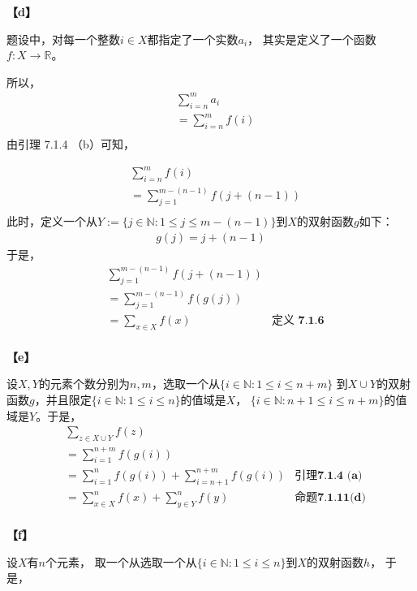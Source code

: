 \documentclass{article}
\theoremstyle{mystyle}
\begin{document}
\textbf{【d】}

题设中，对每一个整数$i \in X$都指定了一个实数$a_i$，
其实是定义了一个函数$f:X \rightarrow \mathbb{R}$。

所以，
\begin{align*}
     & \sum\limits_{i=n}^m a_i   \\
     & =\sum\limits_{i=n}^m f(i) \\
\end{align*}
由引理 7.1.4 （b）可知，

\begin{align*}
     & \sum\limits_{i=n}^m f(i)                 \\
     & = \sum\limits_{j=1}^{m-(n-1)} f(j+(n-1)) \\
\end{align*}
此时，定义一个从$Y := \{j \in \mathbb{N}: 1 \leq j \leq m-(n-1)\}$到$X$的双射函数$g$如下：
\begin{align*}
    g(j) = j+(n-1)
\end{align*}
于是，
\begin{align*}
     & \sum\limits_{j=1}^{m-(n-1)} f(j+(n-1))                     \\
     & =\sum\limits_{j=1}^{m-(n-1)} f(g(j))                       \\
     & =\sum\limits_{x \in X} f(x)            & \textbf{定义 7.1.6} \\
\end{align*}

\textbf{【e】}

设$X,Y$的元素个数分别为$n,m$，选取一个从$\{i \in \mathbb{N}: 1 \leq i \leq n+m\}$
到$X \cup Y$的双射函数$g$，并且限定$\{i \in \mathbb{N}: 1 \leq i \leq n\}$的值域是$X$，
$\{i \in \mathbb{N}: n+1 \leq i \leq n+m\}$的值域是$Y$。于是，
\begin{align*}
     & \sum \limits_{z \in X \cup Y} f(z)                                                           \\
     & = \sum \limits_{i=1}^{n+m} f(g(i))                                                           \\
     & = \sum \limits_{i=1}^{n} f(g(i)) + \sum \limits_{i=n+1}^{n+m} f(g(i)) & \textbf{引理7.1.4 (a)} \\
     & = \sum \limits_{x \in X}^{n} f(x) + \sum \limits_{y \in Y}^{n} f(y)   & \textbf{命题7.1.11(d)} \\
\end{align*}

\textbf{【f】}

设$X$有$n$个元素，
取一个从选取一个从$\{i \in \mathbb{N}: 1 \leq i \leq n\}$到$X$的双射函数$h$，
于是，
\begin{align*}
    
\end{align*}
\end{document}
